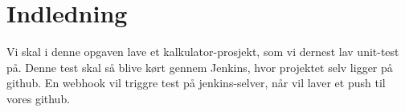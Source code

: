 \section{Indledning}

Vi skal i denne opgaven lave et kalkulator-prosjekt, som vi dernest lav unit-test på. 
Denne test skal så blive kørt gennem Jenkins, hvor projektet selv ligger på github. En webhook vil triggre test på jenkins-selver, når vil laver et push til vores github.